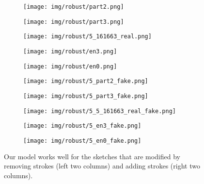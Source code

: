 \documentclass[10pt,twocolumn,letterpaper]{article}
\begin{document}
\newcommand{\robustwidth}{0.18} 
\begin{figure}[tbp]
\captionsetup[subfigure]{labelformat=empty}
\begin{center}
\begin{subfigure}[b]{\robustwidth\linewidth}
  \texttt{[image: img/robust/part2.png]}
  \end{subfigure}
  \begin{subfigure}[b]{\robustwidth\linewidth}
  \texttt{[image: img/robust/part3.png]}
  \end{subfigure}  
  \begin{subfigure}[b]{\robustwidth\linewidth}
  \texttt{[image: img/robust/5\_161663\_real.png]}
  \end{subfigure}
  \begin{subfigure}[b]{\robustwidth\linewidth}
  \texttt{[image: img/robust/en3.png]}
  \end{subfigure}
\begin{subfigure}[b]{\robustwidth\linewidth}
  \texttt{[image: img/robust/en0.png]}
  \end{subfigure}


  
\begin{subfigure}[b]{\robustwidth\linewidth}
  \texttt{[image: img/robust/5\_part2\_fake.png]}
  \subcaption{}
  \end{subfigure}
 \begin{subfigure}[b]{\robustwidth\linewidth}
  \texttt{[image: img/robust/5\_part3\_fake.png]}
  \subcaption{}
  \end{subfigure}  
\begin{subfigure}[b]{\robustwidth\linewidth}
  \texttt{[image: img/robust/5\_5\_161663\_real\_fake.png]}
  \end{subfigure}
  \begin{subfigure}[b]{\robustwidth\linewidth}
  \texttt{[image: img/robust/5\_en3\_fake.png]}
  \subcaption{}
  \end{subfigure}
\begin{subfigure}[b]{\robustwidth\linewidth}
  \texttt{[image: img/robust/5\_en0\_fake.png]}
  \subcaption{}
  \end{subfigure}
\end{center}
\caption{Our model works well for the sketches that are modified by removing strokes (left two columns) and adding strokes (right two columns).}
 \label{fig:robust}
\end{figure}
\end{document}
